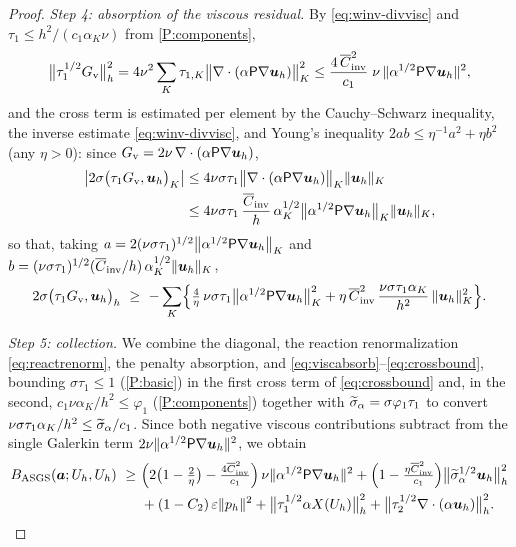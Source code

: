 \begin{proof}
\medskip\noindent\emph{Step 4: absorption of the viscous residual.}
By \eqref{eq:winv-divvisc} and $\tau_1\le h^2/(c_1\alpha_K\nu)$ from \ref{P:components},
\begin{equation}\label{eq:viscabsorb}
  \bigl\lVert\tau_1^{1/2}G_{\mathrm v}\bigr\rVert_h^2
  = 4\nu^2\sum_K\tau_{1,K}\bigl\lVert\nabla\cdot(\alpha\mathsf{P}\nabla\boldsymbol{u}_h)\bigr\rVert_K^2
  \le \frac{4\,\overline{C}_{\mathrm{inv}}^2}{c_1}\;\nu\,\lVert\alpha^{1/2}\mathsf{P}\nabla\boldsymbol{u}_h\rVert^2 ,
\end{equation}
and the cross term is estimated per element by the Cauchy--Schwarz inequality, the inverse
estimate \eqref{eq:winv-divvisc}, and Young's inequality $2ab\le\eta^{-1}a^2+\eta b^2$ (any
$\eta>0$): since $G_{\mathrm v}=2\nu\,\nabla\cdot(\alpha\mathsf{P}\nabla\boldsymbol{u}_h)$,
\[
\begin{aligned}
  \bigl|2\sigma\bigl(\tau_1 G_{\mathrm v},\boldsymbol{u}_h\bigr)_K\bigr|
  &\le 4\nu\sigma\tau_1
    \bigl\lVert\nabla\cdot(\alpha\mathsf{P}\nabla\boldsymbol{u}_h)\bigr\rVert_K\lVert\boldsymbol{u}_h\rVert_K \\
  &\le 4\nu\sigma\tau_1\,\frac{\overline{C}_{\mathrm{inv}}}{h}\,\alpha_K^{1/2}
    \bigl\lVert\alpha^{1/2}\mathsf{P}\nabla\boldsymbol{u}_h\bigr\rVert_K\lVert\boldsymbol{u}_h\rVert_K ,
\end{aligned}
\]
so that, taking $a=2(\nu\sigma\tau_1)^{1/2}\bigl\lVert\alpha^{1/2}\mathsf{P}\nabla\boldsymbol{u}_h\bigr\rVert_K$
and $b=(\nu\sigma\tau_1)^{1/2}(\overline{C}_{\mathrm{inv}}/h)\,\alpha_K^{1/2}\lVert\boldsymbol{u}_h\rVert_K$,
\begin{equation}\label{eq:crossbound}
  2\sigma\bigl(\tau_1 G_{\mathrm v},\buh\bigr)_h
  \ \ge\ -\sum_K\Bigl\{\tfrac{4}{\eta}\,\nu\sigma\tau_1\bigl\lVert\alpha^{1/2}\ViscProj\nabla\buh\bigr\rVert_K^2
  + \eta\,\Cinva^2\,\frac{\nu\sigma\tau_1\alpha_K}{h^2}\,\norm{\buh}_K^2\Bigr\}.
\end{equation}

\medskip\noindent\emph{Step 5: collection.}
We combine the diagonal, the reaction renormalization \eqref{eq:reactrenorm}, the penalty
absorption, and \eqref{eq:viscabsorb}--\eqref{eq:crossbound}, bounding $\sigma\tau_1\le1$
(\ref{P:basic}) in the first cross term of \eqref{eq:crossbound} and, in the second,
$c_1\nu\alpha_K/h^2\le\varphi_1$ (\ref{P:components}) together with
$\widetilde{\sigma}_{\alpha}=\sigma\varphi_1\tau_1$ to convert
$\nu\sigma\tau_1\alpha_K/h^2\le\widetilde{\sigma}_{\alpha}/c_1$. Since both negative viscous contributions
subtract from the single Galerkin term $2\nu\lVert\alpha^{1/2}\mathsf{P}\nabla\boldsymbol{u}_h\rVert^2$, we obtain
\begin{equation}\label{eq:coerccollect}
\begin{aligned}
  \BASGS (\ba;U_h,U_h)
  \ \ge\ &\Bigl(2\bigl(1-\tfrac{2}{\eta}\bigr)-\tfrac{4\Cinva^2}{c_1}\Bigr)\,
  \nu\norm{\alpha^{1/2}\ViscProj\nabla\buh}^2
  + \Bigl(1-\tfrac{\eta\Cinva^2}{c_1}\Bigr)\bigl\lVert\sigmatilde^{1/2}\buh\bigr\rVert_h^2 \\
  &+ (1-C_2)\,\varepsilon\norm{p_h}^2
  + \bigl\lVert\tau_1^{1/2}\alpha\X(U_h)\bigr\rVert_h^2
  + \bigl\lVert\tau_2^{1/2}\nabla\cdot(\alpha\buh)\bigr\rVert_h^2 .
\end{aligned}
\end{equation}


\end{proof}
